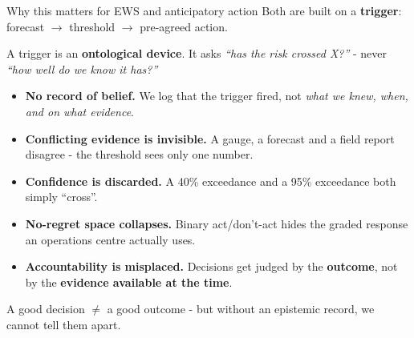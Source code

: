 \documentclass[aspectratio=3218]{beamer}
\begin{document}
\begin{frame}{Why this matters for EWS and anticipatory action}
	Both are built on a \textbf{trigger}: forecast $\rightarrow$ threshold
	$\rightarrow$ pre-agreed action.
	\begin{block}{}
		\centering A trigger is an \textbf{ontological device}. It asks
		\emph{``has the risk crossed X?''} - never \emph{``how well do we know
		it has?''}
	\end{block}
	\begin{itemize}
		\item \textbf{No record of belief.} We log that the trigger fired, not
			\emph{what we knew, when, and on what evidence}.
		\item \textbf{Conflicting evidence is invisible.} A gauge, a forecast and
			a field report disagree - the threshold sees only one number.
		\item \textbf{Confidence is discarded.} A 40\% exceedance and a 95\%
			exceedance both simply ``cross''.
		\item \textbf{No-regret space collapses.} Binary act/don't-act hides the
			graded response an operations centre actually uses.
		\item \textbf{Accountability is misplaced.} Decisions get judged by the
			\textbf{outcome}, not by the \textbf{evidence available at the time}.
	\end{itemize}
	\centering\footnotesize A good decision $\neq$ a good outcome - but without an
	epistemic record, we cannot tell them apart.
\end{frame}
\end{document}
